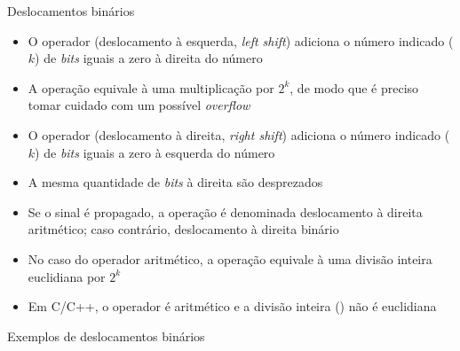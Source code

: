 \begin{frame}[fragile]{Deslocamentos binários}

    \begin{itemize}
        \item O operador  (deslocamento à esquerda, \textit{left shift}) adiciona o número indicado ($k$) de \textit{bits} iguais a zero à direita do número

        \item A operação equivale à uma multiplicação por $2^k$, de modo que é preciso tomar cuidado com um possível \textit{overflow} 

        \item O operador  (deslocamento à direita, \textit{right shift}) adiciona o número indicado ($k$) de \textit{bits} iguais a zero à esquerda do número

        \item A mesma quantidade de \textit{bits} à direita são desprezados

        \item Se o sinal é propagado, a operação é denominada deslocamento à direita aritmético; caso contrário, deslocamento à direita binário

        \item No caso do operador aritmético, a operação equivale à uma divisão inteira euclidiana por $2^k$

        \item Em C/C++, o operador  é aritmético e a divisão inteira () não é euclidiana 

    \end{itemize}

\end{frame}

\begin{frame}[fragile]{Exemplos de deslocamentos binários}
\end{frame}


